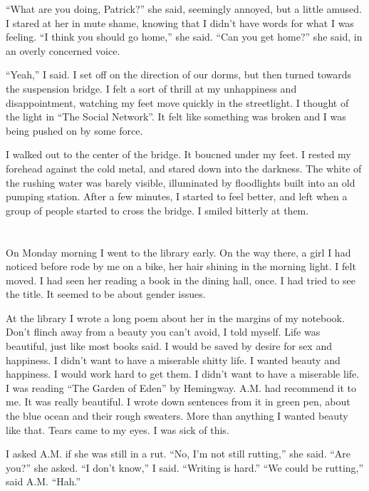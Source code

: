 ``What are you doing, Patrick?'' she said, seemingly annoyed, but a little
amused.  I stared at her in mute shame, knowing that I didn't have words for
what I was feeling.  ``I think you should go home,'' she said.  ``Can you get
home?'' she said, in an overly concerned voice.

``Yeah,'' I said.  I set off on the direction of our dorms, but then turned
towards the suspension bridge.  I felt a sort of thrill at my unhappiness and
disappointment, watching my feet move quickly in the streetlight.  I thought of
the light in ``The Social Network''.  It felt like something was broken and I
was being pushed on by some force.  

I walked out to the center of the bridge.  It boucned under my feet.  I rested my
forehead against the cold metal, and stared down into the darkness.  The white
of the rushing water was barely visible, illuminated by floodlights built into
an old pumping station.  After a few minutes, I started to feel better, and left
when a group of people started to cross the bridge.  I smiled bitterly at them.

\section{}

On Monday morning I went to the library early.  On the way there, a girl I had
noticed before rode by me on a bike, her hair shining in the morning light.  I
felt moved.  I had seen her reading a book in the dining hall, once.  I had
tried to see the title.  It seemed to be about gender issues.

At the library I wrote a long poem about her in the margins of my notebook.
Don't flinch away from a beauty you can't avoid, I told myself.  Life was
beautiful, just like most books said.  I would be saved by desire for sex and
happiness.  I didn't want to have a miserable shitty life.  I wanted beauty and
happiness.  I would work hard to get them.  I didn't want to have a miserable
life.  I was reading ``The Garden of Eden'' by Hemingway.  A.M. had recommend it
to me.  It was really beautiful.  I wrote down sentences from it in green pen,
about the blue ocean and their rough sweaters.  More than anything I wanted
beauty like that.  Tears came to my eyes.  I was sick of this.

I asked A.M. if she was still in a rut.  ``No, I'm not still rutting,'' she
said.  ``Are you?'' she asked.  ``I don't know,'' I said.  ``Writing is hard.''  
``We could be rutting,'' said A.M.  ``Hah.''

